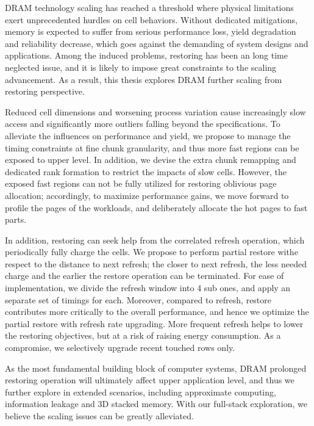 DRAM technology scaling has reached a threshold where physical limitations exert unprecedented hurdles on cell behaviors.
Without dedicated mitigations, memory is expected to suffer from serious performance loss, yield degradation and reliability decrease, which goes against the demanding of system designs and applications. Among the induced problems, restoring has been an long time neglected issue, and it is likely to impose great constraints to the scaling advancement.
As a result, this thesis explores DRAM further scaling from restoring perspective.

Reduced cell dimensions and worsening process variation cause increasingly slow access and significantly more outliers falling beyond the specifications.
To alleviate the influences on performance and yield, we propose to manage the timing constraints at fine chunk granularity, and thus more fast regions can be exposed to upper level. In addition, we devise the extra chunk remapping and dedicated rank formation to restrict the impacts of slow cells. However, the exposed fast regions can not be fully utilized for restoring oblivious page allocation; accordingly, to maximize performance gains, we move forward to profile the pages of the workloads, and deliberately allocate the hot pages to fast parts.

In addition, restoring can seek help from the correlated refresh operation, which periodically fully charge the cells. We propose to perform partial restore withe respect to the distance to next refresh; the closer to next refresh, the less needed charge and the earlier the restore operation can be terminated. For ease of implementation, we divide the refresh window into 4 sub ones, and apply an separate set of timings for each. Moreover, compared to refresh, restore contributes more critically to the overall performance, and hence we optimize the partial restore with refresh rate upgrading. More frequent refresh helps to lower the restoring objectives, but at a risk of raising energy consumption. As a compromise, we selectively upgrade recent touched rows only.

As the most fundamental building block of computer systems, DRAM prolonged restoring operation will ultimately affect upper application level, and thus we further explore in extended scenarios, including approximate computing, information leakage and 3D stacked memory.
With our full-stack exploration, we believe the scaling issues can be greatly alleviated.